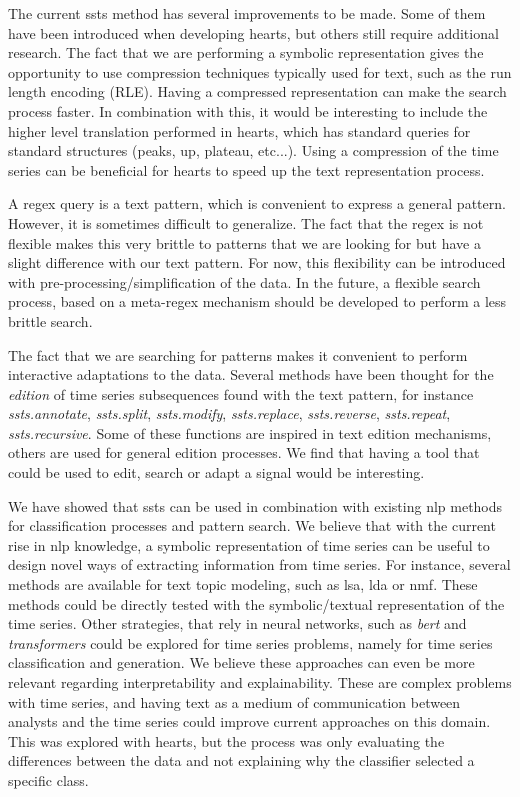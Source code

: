 The current \gls{ssts} method has several improvements to be made. Some of them have been introduced when developing \gls{hearts}, but others still require additional research. The fact that we are performing a symbolic representation gives the opportunity to use compression techniques typically used for text, such as the run length encoding (RLE). Having a compressed representation can make the search process faster. In combination with this, it would be interesting to include the higher level translation performed in \gls{hearts}, which has standard queries for standard structures (peaks, up, plateau, etc...). Using a compression of the time series can be beneficial for \gls{hearts} to speed up the text representation process.
\par
A \gls{regex} query is a text pattern, which is convenient to express a general pattern. However, it is sometimes difficult to generalize. The fact that the \gls{regex} is not flexible makes this very brittle to patterns that we are looking for but have a slight difference with our text pattern. For now, this flexibility can be introduced with pre-processing/simplification of the data. In the future, a flexible search process, based on a meta-regex mechanism should be developed to perform a less brittle search. 
\par
The fact that we are searching for patterns makes it convenient to perform interactive adaptations to the data. Several methods have been thought for the \textit{edition} of time series subsequences found with the text pattern, for instance \textit{ssts.annotate}, \textit{ssts.split}, \textit{ssts.modify}, \textit{ssts.replace}, \textit{ssts.reverse}, \textit{ssts.repeat}, \textit{ssts.recursive}. Some of these functions are inspired in text edition mechanisms, others are used for general edition processes. We find that having a tool that could be used to edit, search or adapt a signal would be interesting.
\par
We have showed that \gls{ssts} can be used in combination with existing \gls{nlp} methods for classification processes and pattern search. We believe that with the current rise in \gls{nlp} knowledge, a symbolic representation of time series can be useful to design novel ways of extracting information from time series. For instance, several methods are available for text topic modeling, such as \gls{lsa}, \gls{lda} or \gls{nmf}. These methods could be directly tested with the symbolic/textual representation of the time series. Other strategies, that rely in neural networks, such as \textit{bert} and \textit{transformers} could be explored for time series problems, namely for time series classification and generation. We believe these approaches can even be more relevant regarding interpretability and explainability. These are complex problems with time series, and having text as a medium of communication between analysts and the time series could improve current approaches on this domain. This was explored with \gls{hearts}, but the process was only evaluating the differences between the data and not explaining why the classifier selected a specific class.
